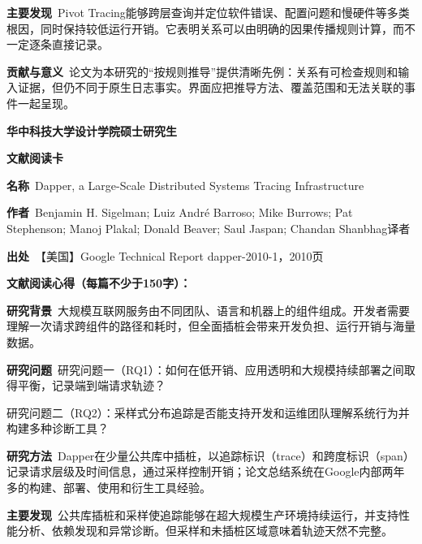 \noindent\textbf{主要发现}\ Pivot Tracing能够跨层查询并定位软件错误、配置问题和慢硬件等多类根因，同时保持较低运行开销。它表明关系可以由明确的因果传播规则计算，而不一定逐条直接记录。\par
\noindent\textbf{贡献与意义}\ 论文为本研究的“按规则推导”提供清晰先例：关系有可检查规则和输入证据，但仍不同于原生日志事实。界面应把推导方法、覆盖范围和无法关联的事件一起呈现。\par
\clearpage
\begin{center}
{\songti\bfseries\fontsize{18.5pt}{27.75pt}\selectfont 华中科技大学设计学院硕士研究生\par}
{\songti\bfseries\fontsize{18.5pt}{27.75pt}\selectfont 文献阅读卡\par}
\end{center}
\vspace{0.25em}
\noindent\underline{}\par
\vspace{0.35em}
\noindent\textbf{名称}\ Dapper, a Large-Scale Distributed Systems Tracing Infrastructure\par
\noindent\textbf{作者}\ Benjamin H. Sigelman; Luiz André Barroso; Mike Burrows; Pat Stephenson; Manoj Plakal; Donald Beaver; Saul Jaspan; Chandan Shanbhag\quad 译者\par
\noindent\textbf{出处}\ 【美国】Google Technical Report dapper-2010-1，2010\quad 页\par
\vspace{0.35em}
\noindent\textbf{文献阅读心得（每篇不少于150字）：}\par
\noindent\textbf{研究背景}\ 大规模互联网服务由不同团队、语言和机器上的组件组成。开发者需要理解一次请求跨组件的路径和耗时，但全面插桩会带来开发负担、运行开销与海量数据。\par
\noindent\textbf{研究问题}\ 研究问题一（RQ1）：如何在低开销、应用透明和大规模持续部署之间取得平衡，记录端到端请求轨迹？\par
研究问题二（RQ2）：采样式分布追踪是否能支持开发和运维团队理解系统行为并构建多种诊断工具？\par
\noindent\textbf{研究方法}\ Dapper在少量公共库中插桩，以追踪标识（trace）和跨度标识（span）记录请求层级及时间信息，通过采样控制开销；论文总结系统在Google内部两年多的构建、部署、使用和衍生工具经验。\par
\noindent\textbf{主要发现}\ 公共库插桩和采样使追踪能够在超大规模生产环境持续运行，并支持性能分析、依赖发现和异常诊断。但采样和未插桩区域意味着轨迹天然不完整。\par
